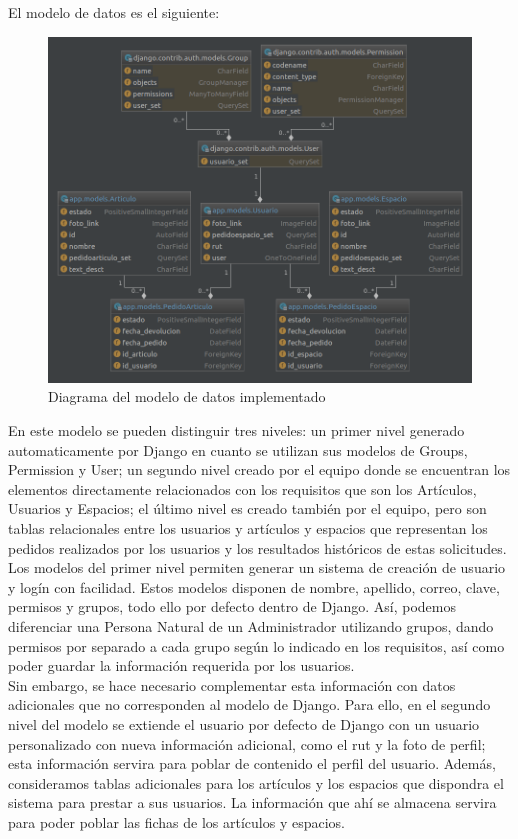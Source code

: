 El modelo de datos es el siguiente: \\
\begin{figure}[H]
\includegraphics[width=0.5\textheight]{images/modelo_de_datos.png}
\caption{Diagrama del modelo de datos implementado} \label{LPUser}
\end{figure}
En este modelo se pueden distinguir tres niveles: un primer nivel generado automaticamente por Django en cuanto se utilizan sus modelos de Groups, Permission y User; un segundo nivel creado por el equipo donde se encuentran los elementos directamente relacionados con los requisitos que son los Artículos, Usuarios y Espacios; el último nivel es creado también por el equipo, pero son tablas relacionales entre los usuarios y artículos y espacios que representan los pedidos realizados por los usuarios y los resultados históricos de estas solicitudes.
Los modelos del primer nivel permiten generar un sistema de creación de usuario y logín con facilidad. Estos modelos disponen de nombre, apellido, correo, clave, permisos y grupos, todo ello por defecto dentro de Django. Así, podemos diferenciar una Persona Natural de un Administrador utilizando grupos, dando permisos por separado a cada grupo según lo indicado en los requisitos, así como poder guardar la información requerida por los usuarios. \\
Sin embargo, se hace necesario complementar esta información con datos adicionales que no corresponden al modelo de Django. Para ello, en el segundo nivel del modelo se extiende el usuario por defecto de Django con un usuario personalizado con nueva información adicional, como el rut y la foto de perfil; esta información servira para poblar de contenido el perfil del usuario. Además, consideramos tablas adicionales para los artículos y los espacios que dispondra el sistema para prestar a sus usuarios. La información que ahí se almacena servira para poder poblar las fichas de los artículos y espacios. \\
